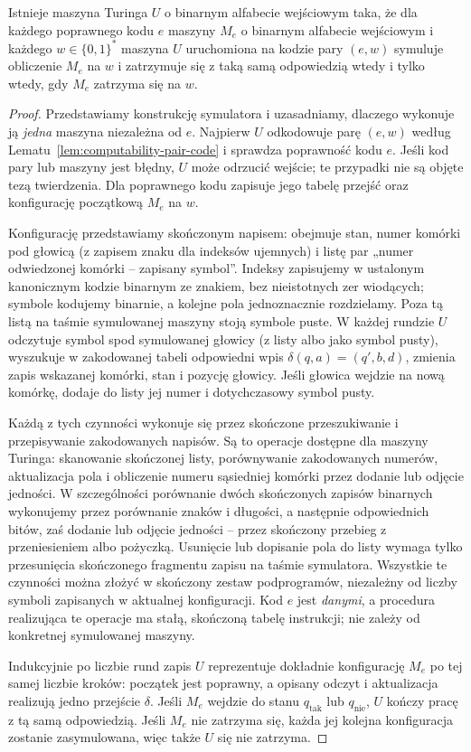 \begin{twierdzenie}\label{thm:computability-universal}
Istnieje maszyna Turinga $U$ o binarnym alfabecie wejściowym
taka, że dla każdego poprawnego kodu $e$ maszyny $M_e$
o binarnym alfabecie wejściowym i każdego $w\in\{0,1\}^*$
maszyna $U$ uruchomiona na kodzie pary $(e,w)$
symuluje obliczenie $M_e$ na $w$ i zatrzymuje się
z taką samą odpowiedzią wtedy i tylko wtedy, gdy $M_e$
zatrzyma się na $w$.
\end{twierdzenie}
\begin{proof}
Przedstawiamy konstrukcję symulatora i uzasadniamy, dlaczego
wykonuje ją \emph{jedna} maszyna niezależna od $e$.
Najpierw $U$ odkodowuje parę $(e,w)$ według
Lematu~\ref{lem:computability-pair-code} i sprawdza poprawność
kodu $e$. Jeśli kod pary lub maszyny jest błędny, $U$ może
odrzucić wejście; te przypadki nie są objęte tezą twierdzenia.
Dla poprawnego kodu zapisuje jego tabelę przejść
oraz konfigurację początkową $M_e$ na $w$.

Konfigurację przedstawiamy skończonym napisem: obejmuje
stan, numer komórki pod głowicą (z zapisem znaku dla indeksów
ujemnych) i listę par „numer odwiedzonej komórki -- zapisany
symbol”. Indeksy zapisujemy w ustalonym kanonicznym kodzie binarnym
ze znakiem, bez nieistotnych zer wiodących; symbole kodujemy
binarnie, a kolejne pola jednoznacznie rozdzielamy.
Poza tą listą na taśmie symulowanej maszyny stoją symbole
puste. W każdej rundzie $U$ odczytuje symbol spod
symulowanej głowicy (z listy albo jako symbol pusty),
wyszukuje w zakodowanej tabeli odpowiedni wpis
$\delta(q,a)=(q',b,d)$, zmienia zapis wskazanej komórki,
stan i pozycję głowicy. Jeśli głowica wejdzie na nową
komórkę, dodaje do listy jej numer i dotychczasowy symbol pusty.

Każdą z tych czynności wykonuje się przez skończone
przeszukiwanie i przepisywanie zakodowanych napisów.
Są to operacje dostępne dla maszyny Turinga: skanowanie
skończonej listy, porównywanie zakodowanych numerów,
aktualizacja pola i obliczenie numeru sąsiedniej komórki
przez dodanie lub odjęcie jedności. W szczególności
porównanie dwóch skończonych zapisów binarnych wykonujemy
przez porównanie znaków i długości, a następnie odpowiednich
bitów, zaś dodanie lub odjęcie jedności -- przez skończony
przebieg z przeniesieniem albo pożyczką. Usunięcie lub dopisanie
pola do listy wymaga tylko przesunięcia skończonego fragmentu
zapisu na taśmie symulatora. Wszystkie te czynności można
złożyć w skończony zestaw podprogramów, niezależny od
liczby symboli zapisanych w aktualnej konfiguracji.
Kod $e$ jest \emph{danymi},
a procedura realizująca te operacje ma stałą, skończoną
tabelę instrukcji; nie zależy od konkretnej symulowanej maszyny.

Indukcyjnie po liczbie rund zapis $U$ reprezentuje dokładnie
konfigurację $M_e$ po tej samej liczbie kroków: początek
jest poprawny, a opisany odczyt i aktualizacja realizują
jedno przejście $\delta$. Jeśli $M_e$ wejdzie do stanu
$q_{\mathrm{tak}}$ lub $q_{\mathrm{nie}}$, $U$ kończy pracę
z tą samą odpowiedzią. Jeśli $M_e$ nie zatrzyma się, każda
jej kolejna konfiguracja zostanie zasymulowana,
więc także $U$ się nie zatrzyma.
\end{proof}

